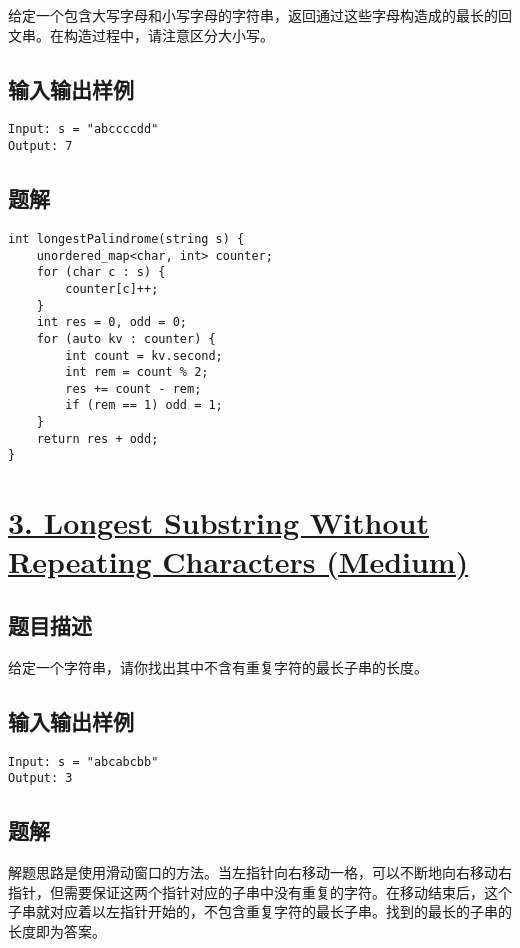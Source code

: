 \documentclass[lang=cn,10pt]{elegantbook}
\begin{document}
给定一个包含大写字母和小写字母的字符串，返回通过这些字母构造成的最长的回文串。在构造过程中，请注意区分大小写。

\subsection*{输入输出样例}

\begin{lstlisting}
Input: s = "abccccdd"
Output: 7
\end{lstlisting}

\subsection*{题解}

\begin{lstlisting}
int longestPalindrome(string s) {
	unordered_map<char, int> counter;
	for (char c : s) {
		counter[c]++;
	}
	int res = 0, odd = 0;
	for (auto kv : counter) {
		int count = kv.second;
		int rem = count % 2;
		res += count - rem;
		if (rem == 1) odd = 1;
	}
	return res + odd;
}
\end{lstlisting}

{\color{red}\section{\href{https://leetcode.cn/problems/longest-substring-without-repeating-characters/}{3. Longest Substring Without Repeating Characters (Medium)}}} \label{ch12.3}

\subsection*{题目描述}

给定一个字符串，请你找出其中不含有重复字符的最长子串的长度。

\subsection*{输入输出样例}

\begin{lstlisting}
Input: s = "abcabcbb"
Output: 3
\end{lstlisting}

\subsection*{题解}

解题思路是使用滑动窗口的方法。当左指针向右移动一格，可以不断地向右移动右指针，但需要保证这两个指针对应的子串中没有重复的字符。在移动结束后，这个子串就对应着以左指针开始的，不包含重复字符的最长子串。找到的最长的子串的长度即为答案。
\end{document}
